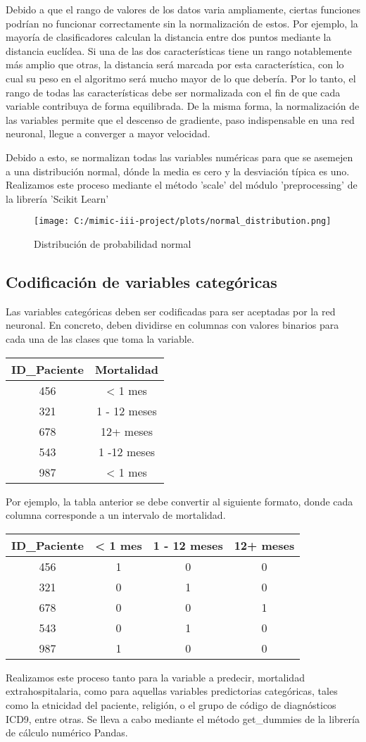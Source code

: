 \documentclass{report}
\begin{document}
Debido a que el rango de valores de los datos varia ampliamente, ciertas funciones podrían no funcionar correctamente sin la normalización de estos. Por ejemplo, la mayoría de clasificadores calculan la distancia entre dos puntos mediante la distancia euclídea. Si una de las dos características tiene un rango notablemente más amplio que otras, la distancia será marcada por esta característica, con lo cual su peso en el algoritmo será mucho mayor de lo que debería. Por lo tanto, el rango de todas las características debe ser normalizada con el fin de que cada variable contribuya de forma equilibrada. De la misma forma, la normalización de las variables permite que el descenso de gradiente, paso indispensable en una red neuronal, llegue a converger a mayor velocidad. 

Debido a esto, se normalizan todas las variables numéricas para que se asemejen a una distribución normal, dónde la media es cero y la desviación típica es uno. Realizamos este proceso mediante el método 'scale' del módulo 'preprocessing' de la librería 'Scikit Learn'

\begin{figure}[h]
\centering
\texttt{[image: C:/mimic-iii-project/plots/normal\_distribution.png]}
\caption{Distribución de probabilidad normal}
\end{figure}
\newpage

\subsection{Codificación de variables categóricas}

Las variables categóricas deben ser codificadas para ser aceptadas por
la red neuronal. En concreto, deben dividirse en columnas con valores
binarios para cada una de las clases que toma la variable.

\begin{longtable}[]{@{}cc@{}}
\toprule
ID\_Paciente & Mortalidad\tabularnewline
\midrule
\endhead
456 & \textless{} 1 mes\tabularnewline
321 & 1 - 12 meses\tabularnewline
678 & 12+ meses\tabularnewline
543 & 1 -12 meses\tabularnewline
987 & \textless{} 1 mes\tabularnewline
\bottomrule
\end{longtable}

Por ejemplo, la tabla anterior se debe convertir al siguiente formato,
donde cada columna corresponde a un intervalo de mortalidad.

\begin{longtable}[]{@{}cccc@{}}
\toprule
ID\_Paciente & \textless{} 1 mes & 1 - 12 meses & 12+
meses\tabularnewline
\midrule
\endhead
456 & 1 & 0 & 0\tabularnewline
321 & 0 & 1 & 0\tabularnewline
678 & 0 & 0 & 1\tabularnewline
543 & 0 & 1 & 0\tabularnewline
987 & 1 & 0 & 0\tabularnewline
\bottomrule
\end{longtable}
Realizamos este proceso tanto para la variable a predecir, mortalidad extrahospitalaria, como para aquellas variables predictorias categóricas,
tales como la etnicidad del paciente, religión, o el grupo de código de
diagnósticos ICD9, entre otras.
Se lleva a cabo mediante el método get\_dummies de la librería de
cálculo numérico Pandas.
\end{document}
